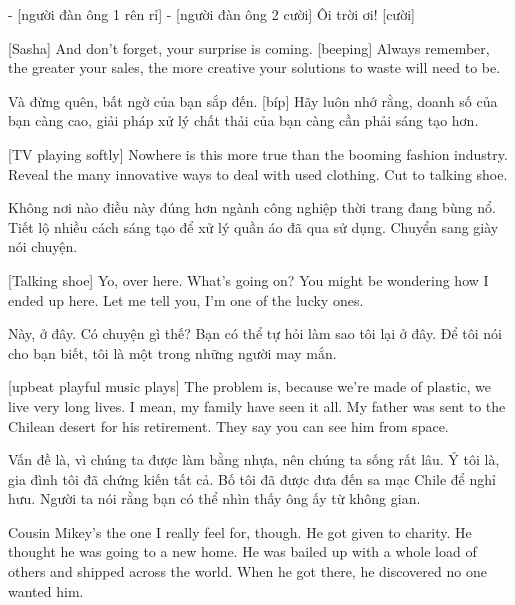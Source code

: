 \documentclass[a4paper]{article}
\begin{document}
	\begin{vietnamese-v2}
		[vù vù]
		- [người đàn ông 1 rên rỉ] - [người đàn ông 2 cười]
		Ôi trời ơi! [cười]
	\end{vietnamese-v2}
	
	[Sasha] And don't forget, your surprise is coming.
	[beeping]
	Always remember, the greater your sales, the more creative your solutions to waste will need to be.
	
	\begin{vietnamese-v2}
		[Sasha] Và đừng quên, bất ngờ của bạn sắp đến.
		[bíp]
		Hãy luôn nhớ rằng, doanh số của bạn càng cao, giải pháp xử lý chất thải của bạn càng cần phải sáng tạo hơn.
	\end{vietnamese-v2}
	
	[TV playing softly]
	Nowhere is this more true than the booming fashion industry.
	Reveal the many innovative ways to deal with used clothing.
	Cut to talking shoe.
	
	\begin{vietnamese-v2}
		Không nơi nào điều này đúng hơn ngành công nghiệp thời trang đang bùng nổ.
		Tiết lộ nhiều cách sáng tạo để xử lý quần áo đã qua sử dụng.
		Chuyển sang giày nói chuyện.
	\end{vietnamese-v2}
	
	[Talking shoe] Yo, over here.
	What's going on?
	You might be wondering how I ended up here.
	Let me tell you, I'm one of the lucky ones.
	
	\begin{vietnamese-v2}
		 Này, ở đây.
		Có chuyện gì thế?
		Bạn có thể tự hỏi làm sao tôi lại ở đây.
		Để tôi nói cho bạn biết, tôi là một trong những người may mắn.
	\end{vietnamese-v2}
	
	[upbeat playful music plays]
	The problem is, because we're made of plastic, we live very long lives.
	I mean, my family have seen it all.
	My father was sent to the Chilean desert for his retirement.
	They say you can see him from space.
	
	\begin{vietnamese-v2}
		Vấn đề là, vì chúng ta được làm bằng nhựa, nên chúng ta sống rất lâu.
		Ý tôi là, gia đình tôi đã chứng kiến tất cả.
		Bố tôi đã được đưa đến sa mạc Chile để nghỉ hưu.
		Người ta nói rằng bạn có thể nhìn thấy ông ấy từ không gian.
	\end{vietnamese-v2}
	
	Cousin Mikey's the one I really feel for, though.
	He got given to charity.
	He thought he was going to a new home.
	He was bailed up with a whole load of others and shipped across the world.
	When he got there, he discovered no one wanted him.
	
\end{document}
